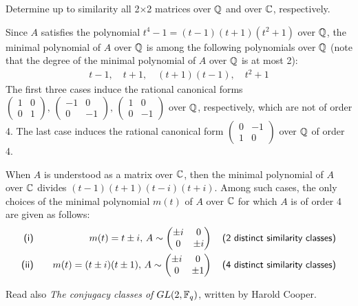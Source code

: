 \begin{prob}
    Determine up to similarity all 2$\times$2 matrices over ${\mathbb{Q}}$ and over ${\mathbb{C}}$, respectively.
\end{prob}
\begin{sol}
    Since $A$ satisfies the polynomial $t^4-1=(t-1)(t+1)(t^2+1)$ over ${\mathbb{Q}}$, the minimal polynomial of $A$ over ${\mathbb{Q}}$ is among the following polynomials over ${\mathbb{Q}}$ (note that the degree of the minimal polynomial of $A$ over ${\mathbb{Q}}$ is at most 2):
    \begin{align*}
        t-1,\quad t+1,\quad (t+1)(t-1),\quad t^2+1
    \end{align*}
    The first three cases induce the rational canonical forms $\begin{pmatrix}1&0\\0&1\end{pmatrix},\,\begin{pmatrix}-1&0\\0&-1\end{pmatrix},\,\begin{pmatrix}1&0\\0&-1\end{pmatrix}$ over ${\mathbb{Q}}$, respectively, which are not of order 4.
    The last case induces the rational canonical form $\begin{pmatrix}0&-1\\1&0\end{pmatrix}$ over ${\mathbb{Q}}$ of order 4.

    When $A$ is understood as a matrix over ${\mathbb{C}}$, then the minimal polynomial of $A$ over ${\mathbb{C}}$ divides $(t-1)(t+1)(t-i)(t+i)$.
    Among such cases, the only choices of the minimal polynomial $m(t)$ of $A$ over ${\mathbb{C}}$ for which $A$ is of order 4 are given as follows:
    \begin{eqnarray*}
        \textsf{(\romannumeral 1)}&\quad&m(t)=t\pm i,\, A\sim\begin{pmatrix}\pm i&0\\0&\pm i\end{pmatrix}\quad\textsf{(2 distinct similarity classes)}\\
        \textsf{(\romannumeral 2)}&\quad&m(t)=(t\pm i)(t\pm 1),\, A\sim\begin{pmatrix}\pm i&0\\0&\pm 1\end{pmatrix}\quad\textsf{(4 distinct similarity classes)}
    \end{eqnarray*}
\end{sol}

Read also \textit{The conjugacy classes of $GL(2, {\mathbb{F}}_q)$}, written by Harold Cooper.